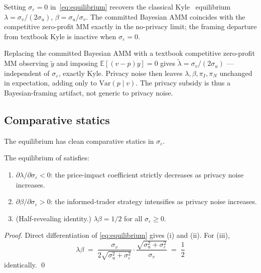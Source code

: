 \documentclass[runningheads]{llncs}
\newcommand{\E}{\mathbb{E}}
\newcommand{\Var}{\mathrm{Var}}
\newcommand{\sigv}{\sigma_v}
\newcommand{\sigu}{\sigma_u}
\newcommand{\sige}{\sigma_\varepsilon}
\newcommand{\ytil}{\tilde y}
\begin{document}
\begin{remark}
\label{rem:sanity}
Setting $\sige = 0$ in~\eqref{eq:equilibrium} recovers the
classical Kyle~\cite{kyle1985} equilibrium $\lambda =
\sigv/(2\sigu)$, $\beta = \sigu/\sigv$. The committed Bayesian AMM
coincides with the competitive zero-profit MM exactly in the
no-privacy limit; the framing departure from textbook Kyle is
inactive when $\sige = 0$.
\end{remark}

\begin{remark}
\label{rem:competitive}
\begin{sloppypar}
Replacing the committed Bayesian AMM with a textbook competitive
zero-profit MM observing $\ytil$ and imposing $\E[(v-p)y] = 0$
gives $\tilde\lambda = \sigv/(2\sigu)$ --- independent of $\sige$,
exactly Kyle. Privacy noise then leaves
$\lambda, \beta, \pi_I, \pi_N$ unchanged in expectation, adding
only to $\Var(p \mid v)$. The privacy subsidy is thus a
Bayesian-framing artifact, not generic to privacy noise.
\end{sloppypar}
\end{remark}

\subsection{Comparative statics}

The equilibrium has clean comparative statics in $\sige$.

\begin{proposition}
\label{prop:comp-statics}
The equilibrium of  satisfies:
\begin{enumerate}[leftmargin=*]
\item $\partial \lambda / \partial \sige < 0$: the price-impact
coefficient strictly decreases as privacy noise increases.
\item $\partial \beta / \partial \sige > 0$: the informed-trader
strategy intensifies as privacy noise increases.
\item (Half-revealing identity.) $\lambda \beta = 1/2$ for all
$\sige \geq 0$.
\end{enumerate}
\end{proposition}

\begin{proof}
Direct differentiation of \eqref{eq:equilibrium} gives (i) and
(ii). For (iii),
\[
\lambda \beta \;=\; \frac{\sigv}{2\sqrt{\sigu^2 + \sige^2}}
   \cdot \frac{\sqrt{\sigu^2 + \sige^2}}{\sigv} \;=\; \frac{1}{2}
\]
identically. \qed
\end{proof}
\end{document}
